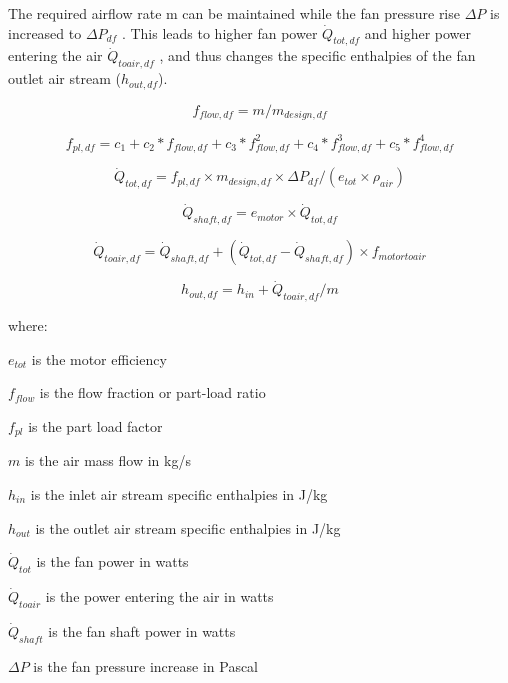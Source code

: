 The required airflow rate m can be maintained while the fan pressure rise \(\Delta P\) is increased to \(\Delta P_{df}\) . This leads to higher fan power \(\dot Q_{tot,df}\) and higher power entering the air \(\dot Q_{toair,df}\) , and thus changes the specific enthalpies of the fan outlet air stream (\(h_{out,df}\)).

\begin{equation}
f_{flow,df} = m / m_{design,df}
\end{equation}

\begin{equation}
f_{pl,df} = c_{1} + c_{2}*f_{flow,df} + c_{3}*f_{flow,df}^2 + c_{4}*f_{flow,df}^3 + c_{5}*f_{flow,df}^4
\end{equation}

\begin{equation}
\dot{Q}_{tot,df} = f_{pl,df} \times m_{design,df} \times \Delta P_{df} / (e_{tot} \times \rho_{air} )
\end{equation}

\begin{equation}
\dot{Q}_{shaft,df} = e_{motor} \times \dot{Q}_{tot, df}
\end{equation}

\begin{equation}
\dot{Q}_{toair,df} = \dot{Q}_{shaft,df} +( \dot{Q}_{tot,df} - \dot{Q}_{shaft,df}) \times f_{motortoair}
\end{equation}

\begin{equation}
h_{out,df} = h_{in} + \dot{Q}_{toair,df} / m
\end{equation}

where:

\(e_{tot}\) is the motor efficiency

\(f_{flow}\) is the flow fraction or part-load ratio

\(f_{pl}\) is the part load factor

\(m\) is the air mass flow in kg/s

\(h_{in}\) is the inlet air stream specific enthalpies in J/kg

\(h_{out}\) is the outlet air stream specific enthalpies in J/kg

\(\dot{Q}_{tot}\) is the fan power in watts

\(\dot{Q}_{toair}\) is the power entering the air in watts

\(\dot{Q}_{shaft}\) is the fan shaft power in watts

\(\Delta P\) is the fan pressure increase in Pascal

